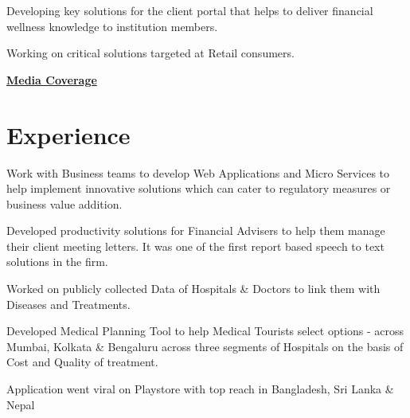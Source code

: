 \documentclass[]{deedy-resume-openfont}
\begin{document}
\begin{minipage}[t]{0.66\textwidth} 


\vspace{\topsep} %
\begin{tightemize}
\item Developing key solutions for the client portal that helps to deliver financial wellness knowledge to institution members.
\item Working on critical solutions targeted at Retail consumers.
\item \href{https://in.reuters.com/article/goldman-sachs-consumer-brokerage/after-years-serving-ceos-goldmans-ayco-also-wants-other-workers-idINL1N21M22J}{\bf Media Coverage}
\end{tightemize}
\sectionsep

\section{Experience}
\begin{tightemize}
\item Work with Business teams to develop Web Applications and Micro Services to help implement innovative solutions which can cater to regulatory measures or business value addition.
\item Developed productivity solutions for Financial Advisers to help them manage their client meeting letters. It was one of the first report based speech to text solutions in the firm.
\end{tightemize}
\sectionsep

\begin{tightemize}
\item Worked on publicly collected Data of Hospitals \& Doctors to link them with Diseases and Treatments.
\item Developed Medical Planning Tool to help Medical Tourists select options - across Mumbai, Kolkata \& Bengaluru across three segments of Hospitals on the basis of Cost and Quality of treatment.
\item Application went viral on Playstore with top reach in Bangladesh, Sri Lanka \& Nepal
\end{tightemize}
\sectionsep


\end{minipage}
\end{document}
